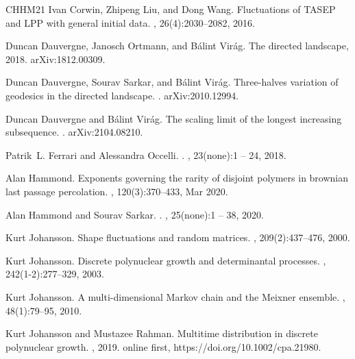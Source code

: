 \documentclass{article}
\numberwithin{equation}{section}
\begin{document}
\begin{thebibliography}{CHHM21}
	Ivan Corwin, Zhipeng Liu, and Dong Wang.
	\newblock Fluctuations of {TASEP} and {LPP} with general initial data.
	, 26(4):2030--2082, 2016.
	
	Duncan Dauvergne, Janosch Ortmann, and B\'alint Vir\'ag.
	\newblock The directed landscape, 2018.
	\newblock arXiv:1812.00309.
	
	Duncan Dauvergne, Sourav Sarkar, and Bálint Virág.
	\newblock Three-halves variation of geodesics in the directed landscape.
	.
	\newblock arXiv:2010.12994.
	
	Duncan Dauvergne and Bálint Virág.
	\newblock The scaling limit of the longest increasing subsequence.
	.
	\newblock arXiv:2104.08210.
	
	Patrik~L. Ferrari and Alessandra Occelli.
	.
	, 23(none):1 -- 24, 2018.
	
	Alan Hammond.
	\newblock Exponents governing the rarity of disjoint polymers in brownian last
	passage percolation.
	,
	120(3):370–433, Mar 2020.
	
	Alan Hammond and Sourav Sarkar.
	.
	, 25(none):1 -- 38, 2020.
	
	Kurt Johansson.
	\newblock Shape fluctuations and random matrices.
	, 209(2):437--476, 2000.
	
	Kurt Johansson.
	\newblock Discrete polynuclear growth and determinantal processes.
	, 242(1-2):277--329, 2003.
	
	Kurt Johansson.
	\newblock A multi-dimensional {M}arkov chain and the {M}eixner ensemble.
	, 48(1):79--95, 2010.
	
	Kurt Johansson and Mustazee Rahman.
	\newblock Multitime distribution in discrete polynuclear growth.
	, 2019.
	\newblock online first, https://doi.org/10.1002/cpa.21980.
	

\end{thebibliography}
\end{document}
